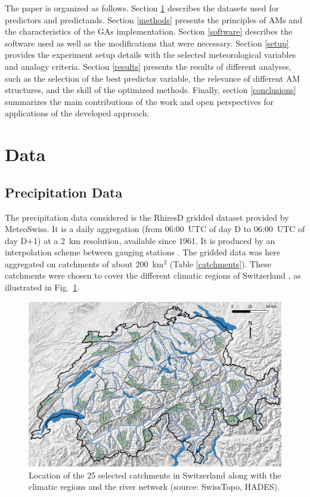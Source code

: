 \documentclass[draft]{agujournal2019}
\begin{document}
The paper is organized as follows. Section \ref{data} describes the datasets used for predictors and predictands. Section \ref{methods} presents the principles of AMs and the characteristics of the GAs implementation. Section \ref{software} describes the software used as well as the modifications that were necessary. Section \ref{setup} provides the experiment setup details with the selected meteorological variables and analogy criteria. Section \ref{results} presents the results of different analyses, such as the selection of the best predictor variable, the relevance of different AM structures, and the skill of the optimized methods. Finally, section \ref{conclusions} summarizes the main contributions of the work and open perspectives for applications of the developed approach.


\section{Data}
\label{data}

\subsection{Precipitation Data}
\label{precip}

The precipitation data considered is the RhiresD gridded dataset provided by MeteoSwiss. It is a daily aggregation (from 06:00~UTC of day D to 06:00~UTC of day D+1) at a 2~km resolution, available since 1961. It is produced by an interpolation scheme between gauging stations \cite{Frei1998}. The gridded data was here aggregated on catchments of about 200~km$^2$ (Table \ref{catchments}). These catchments were chosen to cover the different climatic regions of Switzerland \cite{Schuepp1980}, as illustrated in Fig.~\ref{map}.


\begin{figure}
	\noindent\includegraphics[width=140mm]{figures/map.jpg}
	\caption{Location of the 25 selected catchments in Switzerland along with the climatic regions and the river network (source: SwissTopo, HADES).}
	\label{map}
\end{figure}
\end{document}
